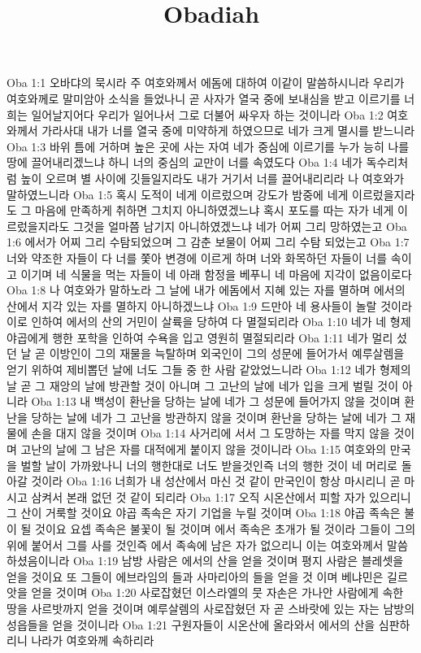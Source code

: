 

\title{Obadiah}

Oba 1:1  오바댜의 묵시라 주 여호와께서 에돔에 대하여 이같이 말씀하시니라 우리가 여호와께로 말미암아 소식을 들었나니 곧 사자가 열국 중에 보내심을 받고 이르기를 너희는 일어날지어다 우리가 일어나서 그로 더불어 싸우자 하는 것이니라
Oba 1:2  여호와께서 가라사대 내가 너를 열국 중에 미약하게 하였으므로 네가 크게 멸시를 받느니라
Oba 1:3  바위 틈에 거하며 높은 곳에 사는 자여 네가 중심에 이르기를 누가 능히 나를 땅에 끌어내리겠느냐 하니 너의 중심의 교만이 너를 속였도다
Oba 1:4  네가 독수리처럼 높이 오르며 별 사이에 깃들일지라도 내가 거기서 너를 끌어내리리라 나 여호와가 말하였느니라
Oba 1:5  혹시 도적이 네게 이르렀으며 강도가 밤중에 네게 이르렀을지라도 그 마음에 만족하게 취하면 그치지 아니하였겠느냐 혹시 포도를 따는 자가 네게 이르렀을지라도 그것을 얼마쯤 남기지 아니하였겠느냐 네가 어찌 그리 망하였는고
Oba 1:6  에서가 어찌 그리 수탐되었으며 그 감춘 보물이 어찌 그리 수탐 되었는고
Oba 1:7  너와 약조한 자들이 다 너를 쫓아 변경에 이르게 하며 너와 화목하던 자들이 너를 속이고 이기며 네 식물을 먹는 자들이 네 아래 함정을 베푸니 네 마음에 지각이 없음이로다
Oba 1:8  나 여호와가 말하노라 그 날에 내가 에돔에서 지혜 있는 자를 멸하며 에서의 산에서 지각 있는 자를 멸하지 아니하겠느냐
Oba 1:9  드만아 네 용사들이 놀랄 것이라 이로 인하여 에서의 산의 거민이 살륙을 당하여 다 멸절되리라
Oba 1:10  네가 네 형제 야곱에게 행한 포학을 인하여 수욕을 입고 영원히 멸절되리라
Oba 1:11  네가 멀리 섰던 날 곧 이방인이 그의 재물을 늑탈하며 외국인이 그의 성문에 들어가서 예루살렘을 얻기 위하여 제비뽑던 날에 너도 그들 중 한 사람 같았었느니라
Oba 1:12  네가 형제의 날 곧 그 재앙의 날에 방관할 것이 아니며 그 고난의 날에 네가 입을 크게 벌릴 것이 아니라
Oba 1:13  내 백성이 환난을 당하는 날에 네가 그 성문에 들어가지 않을 것이며 환난을 당하는 날에 네가 그 고난을 방관하지 않을 것이며 환난을 당하는 날에 네가 그 재물에 손을 대지 않을 것이며
Oba 1:14  사거리에 서서 그 도망하는 자를 막지 않을 것이며 고난의 날에 그 남은 자를 대적에게 붙이지 않을 것이니라
Oba 1:15  여호와의 만국을 벌할 날이 가까왔나니 너의 행한대로 너도 받을것인즉 너의 행한 것이 네 머리로 돌아갈 것이라
Oba 1:16  너희가 내 성산에서 마신 것 같이 만국인이 항상 마시리니 곧 마시고 삼켜서 본래 없던 것 같이 되리라
Oba 1:17  오직 시온산에서 피할 자가 있으리니 그 산이 거룩할 것이요 야곱 족속은 자기 기업을 누릴 것이며
Oba 1:18  야곱 족속은 불이 될 것이요 요셉 족속은 불꽃이 될 것이며 에서 족속은 초개가 될 것이라 그들이 그의 위에 붙어서 그를 사를 것인즉 에서 족속에 남은 자가 없으리니 이는 여호와께서 말씀하셨음이니라
Oba 1:19  남방 사람은 에서의 산을 얻을 것이며 평지 사람은 블레셋을 얻을 것이요 또 그들이 에브라임의 들과 사마리아의 들을 얻을 것 이며 베냐민은 길르앗을 얻을 것이며
Oba 1:20  사로잡혔던 이스라엘의 뭇 자손은 가나안 사람에게 속한 땅을 사르밧까지 얻을 것이며 예루살렘의 사로잡혔던 자 곧 스바랏에 있는 자는 남방의 성읍들을 얻을 것이니라
Oba 1:21  구원자들이 시온산에 올라와서 에서의 산을 심판하리니 나라가 여호와께 속하리라


